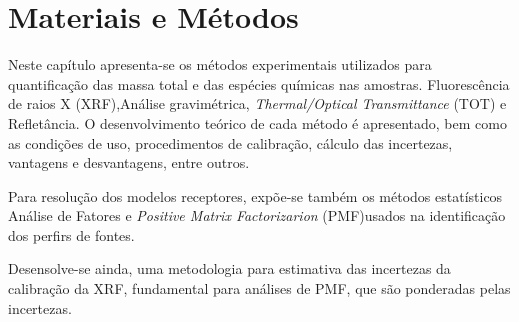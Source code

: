 \chapter{Materiais e Métodos}

Neste capítulo apresenta-se os métodos experimentais utilizados para 
quantificação das massa total e das espécies químicas nas amostras. 
Fluorescência de raios X (XRF),Análise gravimétrica,
\textit{Thermal/Optical Transmittance} (TOT) e Refletância.
O desenvolvimento teórico de cada método é apresentado, bem como 
as condições de uso, procedimentos de calibração, cálculo das incertezas, 
vantagens e desvantagens, entre outros.

Para resolução dos modelos receptores, expõe-se também os métodos 
estatísticos Análise de Fatores e 
\textit{Positive Matrix Factorizarion } (PMF)usados na identificação 
dos perfirs de fontes. 

Desensolve-se ainda, uma metodologia para estimativa das incertezas
da calibração da XRF, fundamental para análises de PMF,
que são ponderadas pelas incertezas.







